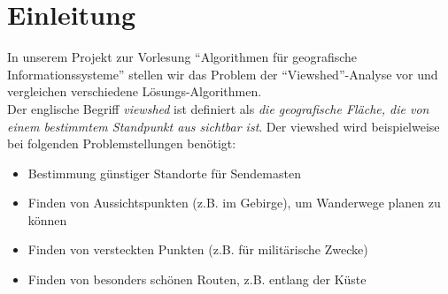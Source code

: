 \section{Einleitung}
In unserem Projekt zur Vorlesung ``Algorithmen für geografische Informationssysteme'' stellen wir das Problem der ``Viewshed''-Analyse vor und 
vergleichen verschiedene Lösungs-Algorithmen. \\ Der englische Begriff \textit{viewshed} ist definiert als \textit{die geografische Fläche, die 
von einem bestimmtem Standpunkt aus sichtbar ist}. Der viewshed wird beispielweise bei folgenden Problemstellungen benötigt:
\begin{itemize}
 \item Bestimmung günstiger Standorte für Sendemasten
 \item Finden von Aussichtspunkten (z.B. im Gebirge), um Wanderwege planen zu können
 \item Finden von versteckten Punkten (z.B. für militärische Zwecke)
 \item Finden von besonders schönen Routen, z.B. entlang der Küste 
\end{itemize}
